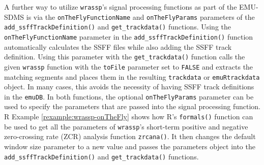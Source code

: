 \documentclass[]{book}
\newenvironment{Shaded}{\begin{snugshade}}{\end{snugshade}}
\newcommand{\CommentTok}[1]{\textcolor[rgb]{0.56,0.35,0.01}{\textit{#1}}}
\newcommand{\DataTypeTok}[1]{\textcolor[rgb]{0.13,0.29,0.53}{#1}}
\newcommand{\DecValTok}[1]{\textcolor[rgb]{0.00,0.00,0.81}{#1}}
\newcommand{\KeywordTok}[1]{\textcolor[rgb]{0.13,0.29,0.53}{\textbf{#1}}}
\newcommand{\NormalTok}[1]{#1}
\newcommand{\OperatorTok}[1]{\textcolor[rgb]{0.81,0.36,0.00}{\textbf{#1}}}
\newcommand{\StringTok}[1]{\textcolor[rgb]{0.31,0.60,0.02}{#1}}
\theoremstyle{definition}
\theoremstyle{definition}
\theoremstyle{definition}
\theoremstyle{remark}
\begin{document}
\begin{Shaded}
\end{Shaded}

A further way to utilize \texttt{wrassp}'s signal processing functions
as part of the EMU-SDMS is via the \texttt{onTheFlyFunctionName} and
\texttt{onTheFlyParams} parameters of the
\texttt{add\_ssffTrackDefinition()} and \texttt{get\_trackdata()}
functions. Using the \texttt{onTheFlyFunctionName} parameter in the
\texttt{add\_ssffTrackDefinition()} function automatically calculates
the SSFF files while also adding the SSFF track definition. Using this
parameter with the \texttt{get\_trackdata()} function calls the given
\texttt{wrassp} function with the \texttt{toFile} parameter set to
\texttt{FALSE} and extracts the matching segments and places them in the
resulting \texttt{trackdata} or \texttt{emuRtrackdata} object. In many
cases, this avoids the necessity of having SSFF track definitions in the
\texttt{emuDB}. In both functions, the optional \texttt{onTheFlyParams}
parameter can be used to specify the parameters that are passed into the
signal processing function. R Example \ref{rexample:wrassp-onTheFly}
shows how R's \texttt{formals()} function can be used to get all the
parameters of \texttt{wrassp}'s short-term positive and negative
zero-crossing rate (ZCR) analysis function \texttt{zrcana()}. It then
changes the default window size parameter to a new value and passes the
parameters object into the \texttt{add\_ssffTrackDefinition()} and
\texttt{get\_trackdata()} functions.
\end{document}
